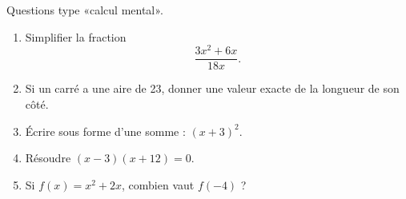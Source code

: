 
\begin{exercice}\label{exosmath-0568}

    Questions type «calcul mental».
    \begin{enumerate}
        \item
            Simplifier la fraction
            \begin{equation*}
                \frac{ 3x^2+6x }{ 18x }.
            \end{equation*}
        \item
            Si un carré a une aire de \unit{23}{\centi\square\meter}, donner une valeur exacte de la longueur de son côté.
        \item
            Écrire sous forme d'une somme : \( (x+3)^2\).
        \item
            Résoudre \( (x-3)(x+12)=0\).
        \item 
            Si \( f(x)=x^2+2x\), combien vaut \( f(-4)\) ?
    \end{enumerate}

\end{exercice}

